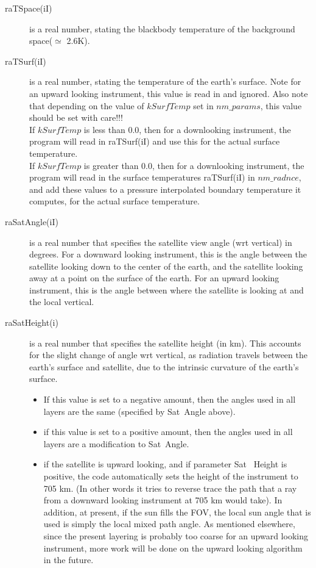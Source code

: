 \documentclass[12pt]{article}
\begin{document}
{\begin{description}
\item[{\sf raTSpace(iI)}] is a real number, stating the blackbody 
temperature of the background space($\simeq$ 2.6K). \\

\item[{\sf raTSurf(iI)}] is a real number, stating the
temperature of the earth's surface.  Note for an upward looking
instrument, this value is read in and ignored. Also note that depending on the
value of $kSurfTemp$ set in $nm\_params$, this value should be set with 
care!!!\\
If $kSurfTemp$ is less than 0.0, then for a downlooking instrument, the 
program will read in raTSurf(iI) and use this for the actual surface 
temperature.\\
If $kSurfTemp$ is greater than 0.0, then for a downlooking instrument, the 
program will read in the surface temperatures raTSurf(iI) in $nm\_radnce$, 
and add these values to a pressure interpolated boundary temperature it 
computes, for the actual surface temperature.

\item[{\sf raSatAngle(iI)}] is a real number that specifies the satellite view 
angle (wrt vertical) in degrees.  For a downward looking instrument, this is 
the angle between the satellite looking down to the center of the earth,
and the satellite looking away at a point on the surface of the
earth.  For an upward looking instrument, this is the angle between where the
satellite is looking at and the local vertical.

\item[{\sf raSatHeight(i)}] is a real number that specifies
the satellite height (in km).  This accounts for the slight change
of angle wrt vertical, as radiation travels between the earth's
surface and satellite, due to the intrinsic curvature of the earth's
surface.

\begin{itemize}
\item If this value is set to a negative amount, then the angles used
  in all layers are the same (specified by {\sf Sat~Angle} above).
\item if this value is set to a positive amount, then the angles used
  in all layers are a modification to {\sf Sat~Angle}.
\item if the satellite is upward looking, and if parameter {\sf Sat
    ~Height} is positive, the code automatically sets the height of
    the instrument to 705 km.  (In other words it tries to reverse trace 
    the path that a ray from a downward looking instrument at 705 km 
    would take). In addition, at present, if the sun fills the FOV, 
    the local sun angle that is used is simply the local mixed path angle.
    As mentioned elsewhere, since the present layering is probably too
    coarse for an upward looking instrument, more work will be done on the
    upward looking algorithm in the future.
\end{itemize}
\end{description}

}
\end{document}
